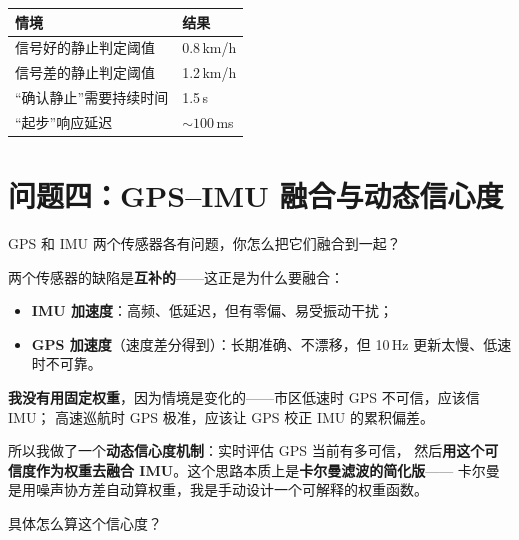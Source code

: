 \documentclass[UTF8,11pt,a4paper]{ctexart}
\begin{document}
\begin{summary}
\begin{center}\begin{tabular}{ll}
\toprule
情境 & 结果 \\\midrule
信号好的静止判定阈值 & 0.8\,km/h \\
信号差的静止判定阈值 & 1.2\,km/h \\
``确认静止''需要持续时间 & 1.5\,s \\
``起步''响应延迟 & $\sim 100$\,ms \\
\bottomrule
\end{tabular}\end{center}
\end{summary}

\section{问题四：GPS--IMU 融合与动态信心度}

\begin{interviewer}
GPS 和 IMU 两个传感器各有问题，你怎么把它们融合到一起？
\end{interviewer}

\begin{candidate}
两个传感器的缺陷是\textbf{互补的}——这正是为什么要融合：
\begin{itemize}[leftmargin=1.4em,topsep=2pt,itemsep=2pt]
  \item \textbf{IMU 加速度}：高频、低延迟，但有零偏、易受振动干扰；
  \item \textbf{GPS 加速度}（速度差分得到）：长期准确、不漂移，但 10\,Hz 更新太慢、低速时不可靠。
\end{itemize}

\medskip
\textbf{我没有用固定权重}，因为情境是变化的——市区低速时 GPS 不可信，应该信 IMU；
高速巡航时 GPS 极准，应该让 GPS 校正 IMU 的累积偏差。

\medskip
所以我做了一个\textbf{动态信心度机制}：实时评估 GPS 当前有多可信，
然后\textbf{用这个可信度作为权重去融合 IMU}。这个思路本质上是\textbf{卡尔曼滤波的简化版}——
卡尔曼是用噪声协方差自动算权重，我是手动设计一个可解释的权重函数。
\end{candidate}

\begin{interviewer}
具体怎么算这个信心度？
\end{interviewer}
\end{document}

